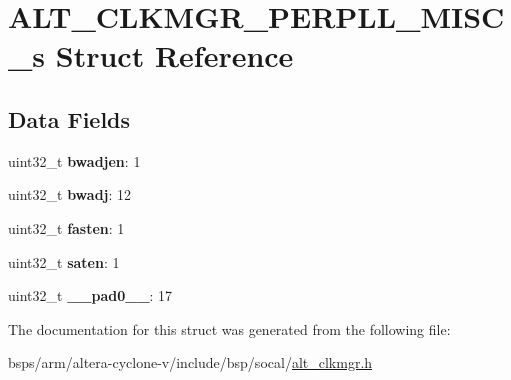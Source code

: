 \hypertarget{structALT__CLKMGR__PERPLL__MISC__s}{}\section{A\+L\+T\+\_\+\+C\+L\+K\+M\+G\+R\+\_\+\+P\+E\+R\+P\+L\+L\+\_\+\+M\+I\+S\+C\+\_\+s Struct Reference}
\label{structALT__CLKMGR__PERPLL__MISC__s}
\subsection*{Data Fields}
\begin{DoxyCompactItemize}
\item 
\mbox{\label{structALT__CLKMGR__PERPLL__MISC__s_a48da116e23a80a2f445ec9679d593bc6}} 
uint32\+\_\+t {\bfseries bwadjen}\+: 1
\item 
\mbox{\label{structALT__CLKMGR__PERPLL__MISC__s_a48f91584e263920e8b7ed23558f09d46}} 
uint32\+\_\+t {\bfseries bwadj}\+: 12
\item 
\mbox{\label{structALT__CLKMGR__PERPLL__MISC__s_af5f7968f61d9066f151e4db707b13d7a}} 
uint32\+\_\+t {\bfseries fasten}\+: 1
\item 
\mbox{\label{structALT__CLKMGR__PERPLL__MISC__s_a9faec5c9cc0fb9f8eae7384cd96d1af8}} 
uint32\+\_\+t {\bfseries saten}\+: 1
\item 
\mbox{\label{structALT__CLKMGR__PERPLL__MISC__s_a78eefd47240717c809e17d7049d0bfb8}} 
uint32\+\_\+t {\bfseries \+\_\+\+\_\+pad0\+\_\+\+\_\+}\+: 17
\end{DoxyCompactItemize}


The documentation for this struct was generated from the following file\+:\begin{DoxyCompactItemize}
\item 
bsps/arm/altera-\/cyclone-\/v/include/bsp/socal/\mbox{\hyperlink{alt__clkmgr_8h}{alt\+\_\+clkmgr.\+h}}\end{DoxyCompactItemize}
